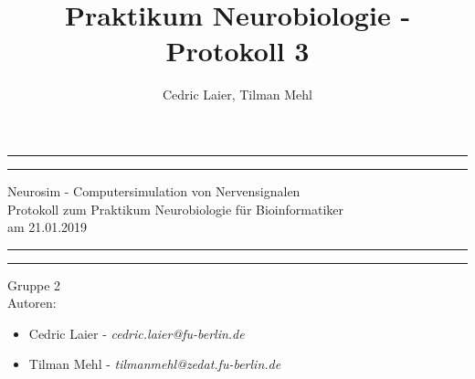\documentclass[a4paper]{article}
\title{Praktikum Neurobiologie - Protokoll 3}
\author{Cedric Laier, Tilman Mehl}
\begin{document}
\begin{titlepage} %

	\centering %
	
	\scshape %
	
	\vspace*{\baselineskip} %
	
	
	\rule{\textwidth}{1.6pt}\vspace*{-\baselineskip}\vspace*{2pt} %
	\rule{\textwidth}{0.4pt} %
	\vspace{0.75\baselineskip} %
	{\LARGE Neurosim - Computersimulation von Nervensignalen} {\\Protokoll zum Praktikum Neurobiologie für Bioinformatiker\\ am 21.01.2019} %

	
	\vspace{0.75\baselineskip} %
	
	\rule{\textwidth}{0.4pt}\vspace*{-\baselineskip}\vspace{3.2pt} %
	\rule{\textwidth}{1.6pt} %
	
	\vspace{2\baselineskip} %
	
	\vspace{2.0\baselineskip} %

{\LARGE Gruppe 2}
\vspace{2.5\baselineskip} \\
	
{\LARGE Autoren:}
\begin{itemize}
\item Cedric Laier - \textit{cedric.laier@fu-berlin.de}
\item Tilman Mehl - \textit{tilmanmehl@zedat.fu-berlin.de}
\end{itemize}
\vspace{2.5\baselineskip}


\end{titlepage}
\end{document}
